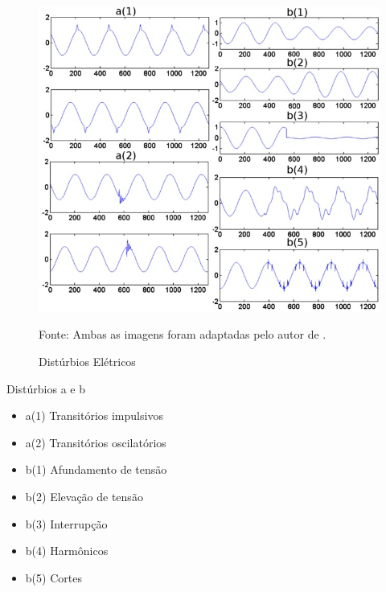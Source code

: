 \begin{figure}[hbt]
\begin{center}
\caption{Distúrbios Elétricos}
\includegraphics[width=12cm]{imagens/Imagema-final-AB2.jpg}
\par{\small Fonte: Ambas as imagens foram adaptadas pelo autor de \cite{FER10}.}
\label{fig:tiposperturbações}
\end{center}
\end{figure}
\par Distúrbios a e b
\begin{itemize}
\item a(1) Transitórios impulsivos
\item a(2) Transitórios oscilatórios
\item b(1) Afundamento de tensão
\item b(2) Elevação de tensão
\item b(3) Interrupção
\item b(4) Harmônicos 
\item b(5) Cortes
\end{itemize}
